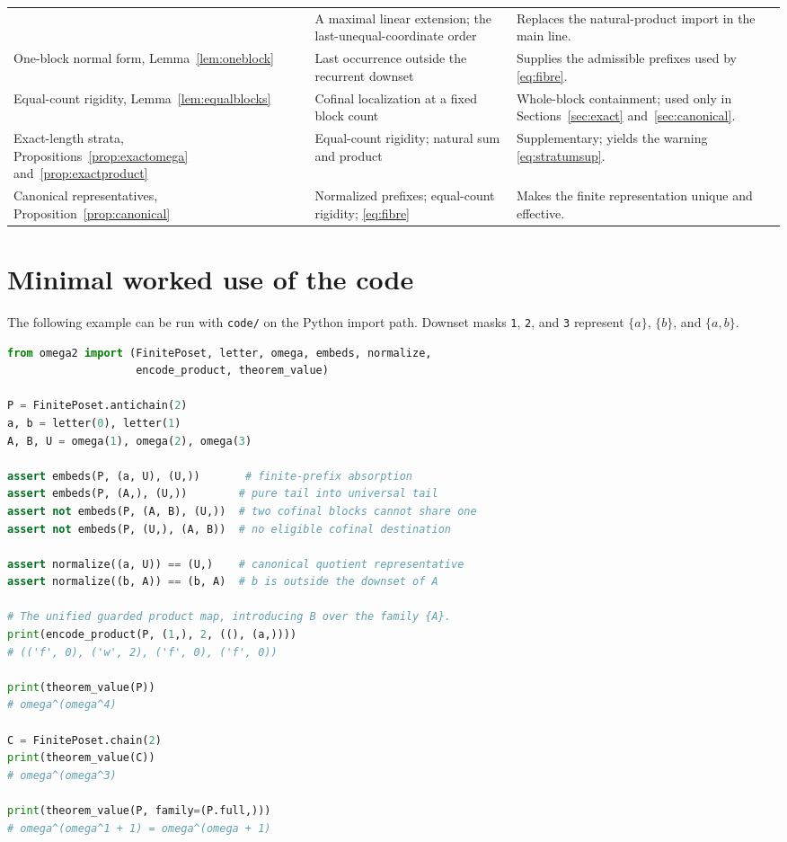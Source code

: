 \documentclass[11pt,a4paper]{article}
\numberwithin{equation}{section}
\theoremstyle{definition}
\theoremstyle{remark}
\begin{document}
\begin{longtable}{@{}>{\raggedright\arraybackslash}p{}>{\raggedright\arraybackslash}p{}>{\raggedright\arraybackslash}p{}@{}}
 & A maximal linear extension; the last-unequal-coordinate order
 & Replaces the natural-product import in the main line.\\[3pt]
One-block normal form, Lemma~\ref{lem:oneblock}
 & Last occurrence outside the recurrent downset
 & Supplies the admissible prefixes used by \eqref{eq:fibre}.\\[3pt]
Equal-count rigidity, Lemma~\ref{lem:equalblocks}
 & Cofinal localization at a fixed block count
 & Whole-block containment; used only in
   Sections~\ref{sec:exact} and~\ref{sec:canonical}.\\[3pt]
Exact-length strata, Propositions~\ref{prop:exactomega}
and~\ref{prop:exactproduct}
 & Equal-count rigidity; natural sum and product
 & Supplementary; yields the warning \eqref{eq:stratumsup}.\\[3pt]
Canonical representatives, Proposition~\ref{prop:canonical}
 & Normalized prefixes; equal-count rigidity; \eqref{eq:fibre}
 & Makes the finite representation unique and effective.\\
\bottomrule
\end{longtable}

\section{Minimal worked use of the code}
\label{app:code}

The following example can be run with \texttt{code/} on the Python import
path. Downset masks \texttt{1}, \texttt{2}, and \texttt{3} represent
$\{a\}$, $\{b\}$, and $\{a,b\}$.

\begin{lstlisting}[language=Python]
from omega2 import (FinitePoset, letter, omega, embeds, normalize,
                    encode_product, theorem_value)

P = FinitePoset.antichain(2)
a, b = letter(0), letter(1)
A, B, U = omega(1), omega(2), omega(3)

assert embeds(P, (a, U), (U,))       # finite-prefix absorption
assert embeds(P, (A,), (U,))        # pure tail into universal tail
assert not embeds(P, (A, B), (U,))  # two cofinal blocks cannot share one
assert not embeds(P, (U,), (A, B))  # no eligible cofinal destination

assert normalize((a, U)) == (U,)    # canonical quotient representative
assert normalize((b, A)) == (b, A)  # b is outside the downset of A

# The unified guarded product map, introducing B over the family {A}.
print(encode_product(P, (1,), 2, ((), (a,))))
# (('f', 0), ('w', 2), ('f', 0), ('f', 0))

print(theorem_value(P))
# omega^(omega^4)

C = FinitePoset.chain(2)
print(theorem_value(C))
# omega^(omega^3)

print(theorem_value(P, family=(P.full,)))
# omega^(omega^1 + 1) = omega^(omega + 1)
\end{lstlisting}
\end{document}
